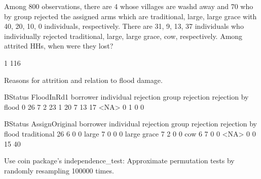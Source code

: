 Among 800 observations, there are 4 whose villages are washd away and 70 who by group rejected the assigned arms which are traditional, large, large grace with 40, 20, 10, 0 individuals, respectively. There are 31, 9, 13, 37 individuals who individually rejected traditional, large, large grace, cow, respectively. Among attrited HHs, when were they lost?
\begin{Schunk}
\begin{Soutput}

  1 
116 
\end{Soutput}
\end{Schunk}
Reasons for attrition and relation to flood damage.
\begin{Schunk}
\begin{Soutput}
          BStatus
FloodInRd1 borrower individual rejection group rejection rejection by flood
      0          26                    7               2                 23
      1          20                    7              13                 17
      <NA>        0                    1               0                  0
\end{Soutput}
\begin{Soutput}
              BStatus
AssignOriginal borrower individual rejection group rejection rejection by flood
   traditional       26                    6               0                  0
   large              7                    0               0                  0
   large grace        7                    2               0                  0
   cow                6                    7               0                  0
   <NA>               0                    0              15                 40
\end{Soutput}
\end{Schunk}
Use \textsf{coin} package's \textsf{independence\_test}: Approximate permutation tests by randomly resampling 100000 times.


